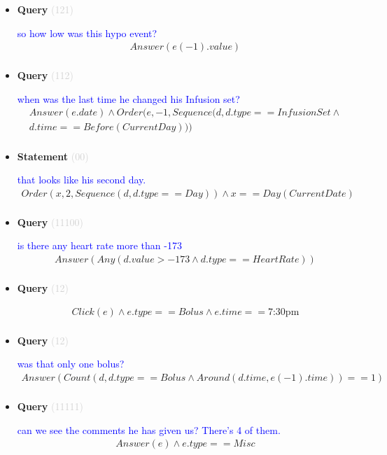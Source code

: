 \documentclass[11pt]{article}
\newcommand{\key}[1]{\textcolor{lightgray}{#1}}
\newcounter{CQuery}
\newcounter{CStatement}
\begin{document}
\begin{itemize}
\item
\textbf{Query\theCQuery} \key{(121)} \addtocounter{CQuery}{1}
\textcolor{blue}{ so how low was this hypo event? }
\begin{multline*}
Answer(e(-1).value) \\ 
\end{multline*}


\item
\textbf{Query\theCQuery} \key{(112)} \addtocounter{CQuery}{1}
\textcolor{blue}{ when was the last time he changed his Infusion set? }
\begin{multline*}
Answer(e.date) \wedge Order(e, -1, Sequence(d, d.type==InfusionSet\wedge \\ 
d.time==Before(CurrentDay))) \\ 
\end{multline*}


\item
\textbf{Statement\theCStatement} \key{(00)} \addtocounter{CStatement}{1}
\textcolor{blue}{ that looks like his second day. }
\begin{multline*}
Order(x, 2, Sequence(d, d.type==Day)) \wedge x==Day(CurrentDate) \\ 
\end{multline*}


\item
\textbf{Query\theCQuery} \key{(11100)} \addtocounter{CQuery}{1}
\textcolor{blue}{ is there any heart rate more than -173 }
\begin{multline*}
Answer(Any(d.value>-173 \wedge d.type==HeartRate)) \\ 
\end{multline*}


\item
\textbf{Query\theCQuery} \key{(12)} \addtocounter{CQuery}{1}
\textcolor{blue}{  }
\begin{multline*}
Click(e) \wedge e.type == Bolus \wedge e.time==\mbox{7:30pm} \\ 
\end{multline*}


\item
\textbf{Query\theCQuery} \key{(12)} \addtocounter{CQuery}{1}
\textcolor{blue}{ was that only one bolus? }
\begin{multline*}
Answer(Count(d, d.type==Bolus \wedge Around(d.time, e(-1).time))==1) \\ 
\end{multline*}


\item
\textbf{Query\theCQuery} \key{(11111)} \addtocounter{CQuery}{1}
\textcolor{blue}{ can we see the comments he has given us? There's 4 of them. }
\begin{multline*}
Answer(e) \wedge e.type==Misc \\ 
\end{multline*}



\end{itemize}
\end{document}
